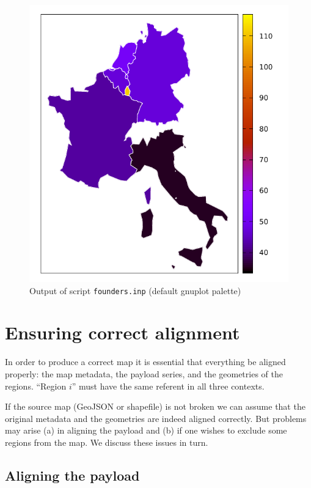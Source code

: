 \documentclass{article}
\begin{document}
\begin{figure}[htbp]
  \begin{center}
  \includegraphics[scale=0.9]{GDPpc.pdf}
\end{center}
\caption{Output of script \texttt{founders.inp} (default gnuplot palette)}
\label{fig:founders}
\end{figure}

\section{Ensuring correct alignment}
\label{sec:pairing}

In order to produce a correct map it is essential that everything be
aligned properly: the map metadata, the payload series, and the
geometries of the regions. ``Region $i$'' must have the same referent
in all three contexts.

If the source map (GeoJSON or shapefile) is not broken we can assume
that the original metadata and the geometries are indeed aligned
correctly. But problems may arise (a) in aligning the payload and (b)
if one wishes to exclude some regions from the map. We discuss these
issues in turn.

\subsection{Aligning the payload}
\end{document}
